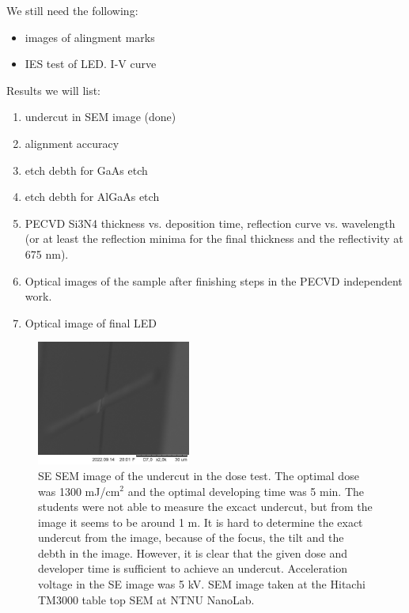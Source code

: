 


We still need the following:
\begin{itemize}
    \color{red}
    \item images of alingment marks
    \item IES test of LED. I-V curve
\end{itemize}


Results we will list:

\begin{enumerate}
    \color{olive}
    \item undercut in SEM image (done)
          \color{violet}
    \item alignment accuracy
    \item etch debth for GaAs etch
    \item etch debth for AlGaAs etch
    \item PECVD Si3N4 thickness vs. deposition time, reflection curve vs. wavelength (or at least the reflection minima for the final thickness and the reflectivity at 675 nm).
    \item Optical images of the sample after finishing steps in the PECVD independent work.
    \item Optical image of final LED
\end{enumerate}


\begin{figure}[ht]
    \centering
    \includegraphics[width=0.45\textwidth]{figures/Undercut_5min_1200mJcm-2.jpg}
    \caption{
        SE SEM image of the undercut in the dose test.
        The optimal dose was 1300 mJ/cm$^2$ and the optimal developing time was 5 min.
        The students were not able to measure the excact undercut, but from the image it seems to be around 1 \textmu m.
        It is hard to determine the exact undercut from the image, because of the focus, the tilt and the debth in the image.
        However, it is clear that the given dose and developer time is sufficient to achieve an undercut.
        Acceleration voltage in the SE image was 5 kV.
        SEM image taken at the Hitachi TM3000 table top SEM at NTNU NanoLab.
    }
    \label{fig:undercut}
\end{figure}